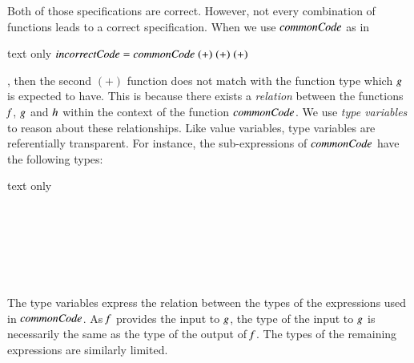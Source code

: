 Both of those specifications are correct.
However, not every combination of functions leads to a correct specification.
When we use \ensuremath{\Varid{commonCode}} as in 
\begin{changemargin}{1cm}{0cm}
\begin{expansionno}{text only}
\ensuremath{\Varid{incorrectCode}\mathrel{=}\Varid{commonCode}\;(\mathbin{+})\;(\mathbin{+})\;(\mathbin{+})}
\end{expansionno}
\end{changemargin}
, then the second \ensuremath{(\mathbin{+})} function does not match with the function type which \ensuremath{\Varid{g}} is expected to have.
This is because there exists a \textit{relation} between the functions \ensuremath{\Varid{f}}, \ensuremath{\Varid{g}} and \ensuremath{\Varid{h}} within the context of the function \ensuremath{\Varid{commonCode}}.
We use \textit{type variables} to reason about these relationships.
Like value variables, type variables are referentially transparent.
For instance, the sub-expressions of \ensuremath{\Varid{commonCode}} have the following types:
\begin{changemargin}{1cm}{0cm}
\begin{expansionno}{text only}
\begin{hscode}\SaveRestoreHook
{}%
%
%
\>[B]{}\<[5]%
\>[5]{}\mathbin{::}\to {}\to {}\<[E]%
\\
\>[B]{}\<[5]%
\>[5]{}\mathbin{::}\to {}\<[E]%
\\
\>[B]{}\<[5]%
\>[5]{}\mathbin{::}\to {}\to {}\<[E]%
\\
\>[B]{}\<[5]%
\>[5]{}\mathbin{::}\<[E]%
\\
\>[B]{}\<[5]%
\>[5]{}\mathbin{::}\<[E]%
\\
\>[B]{}\<[5]%
\>[5]{}\mathbin{::}\<[E]%
\ColumnHook
\end{hscode}\resethooks
\end{expansionno}
\end{changemargin}
The type variables express the relation between the types of the expressions used in \ensuremath{\Varid{commonCode}}.
As \ensuremath{\Varid{f}} provides the input to \ensuremath{\Varid{g}}, the type of the input to \ensuremath{\Varid{g}} is necessarily the same as the type of the output of \ensuremath{\Varid{f}}.
The types of the remaining expressions are similarly limited.

